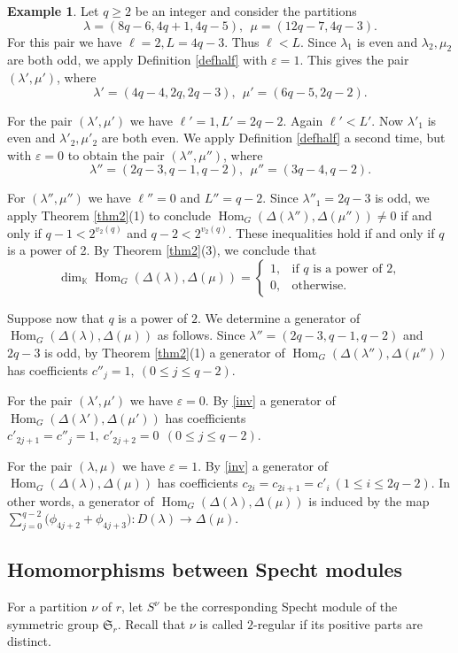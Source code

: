 \documentclass[11pt]{amsart}
\theoremstyle{remark}
\theoremstyle{definition}
\newtheorem{example}[theorem]{Example}
\newcommand{\Hom}{\operatorname{Hom}}
\newcommand{\D}{\Delta}
\newcommand{\la}{\lambda}
\newcommand{\K}{\mathbb K}
\numberwithin{equation}{section}
\begin{document}
\begin{example}
	Let $q\ge2$ be an integer and consider the partitions
	\[
	\la=(8q-6,4q+1,4q-5),
	\ \ 
	\mu=(12q-7,4q-3).
	\]
	For this pair we have
$
	\ell=2, 
	L=4q-3.
$
	Thus $\ell<L$. Since $\la_1$ is even and $\la_2,\mu_2$ are both odd,
	we apply Definition \ref{defhalf} with $\varepsilon=1$. This gives
	the pair $(\la',\mu')$, where
	\[
	\la'=(4q-4,2q,2q-3),
	\ \ 
	\mu'=(6q-5,2q-2).
	\]
	
	For the pair $(\la',\mu')$ we have
$
	\ell'=1, L'=2q-2.
$
	Again $\ell'<L'$. Now $\la'_1$ is even and $\la'_2,\mu'_2$ are both
	even. We apply Definition \ref{defhalf} a second time, but with
	$\varepsilon=0$ to obtain the pair $(\la'',\mu'')$, where
	\[
	\la''=(2q-3,q-1,q-2),
	\ \ 
	\mu''=(3q-4,q-2).
	\]
	
	For $(\la'',\mu'')$ we have $\ell''=0$ and $L''=q-2$.
	Since $\la''_1=2q-3$ is odd, we apply Theorem \ref{thm2}(1)
	to conclude $\Hom_G(\Delta(\la''),\Delta(\mu'')) \neq 0$ if and only if
	$	q-1<2^{v_2(q)}$ and
	$
	q-2<2^{v_2(q)}.
	$
	These inequalities hold if and only if $q$ is a power of 2. By
	Theorem \ref{thm2}(3), we conclude that
	\[
	\dim_\K\Hom_G(\Delta(\la),\Delta(\mu))
	=
	\begin{cases}
		1,&\text{if $q$ is a power of $2$},\\
		0,&\text{otherwise}.
	\end{cases}
	\]
	
	Suppose now that $q$ is a power of $2$. We determine a generator of $\Hom_G(\Delta(\la),\Delta(\mu))$ as follows. Since $\la''=(2q-3,q-1,q-2)$ and $2q-3$ is odd, by
	Theorem \ref{thm2}(1) a generator of $\Hom_G(\D(\la''),\D(\mu''))$
	has coefficients $c''_j=1,  \ (0\le j\le q-2)$.
	
	For the pair $(\la',\mu')$ we have $\varepsilon=0$. By \eqref{inv} a generator of  $\Hom_G(\D(\la'),\D(\mu'))$ has coefficients
$
	c'_{2j+1}=c''_j=1,
	\ 
	c'_{2j+2}=0
	\ \ (0\le j\le q-2).
$
	
	For the pair $(\la,\mu)$ we have $\varepsilon=1$. By \eqref{inv} a generator of  $\Hom_G(\D(\la),\D(\mu))$ has coefficients
	$
	c_{2i}=c_{2i+1}=c'_i
	\  (1\le i\le 2q-2).
	$
	In other words, a generator of
	$\Hom_G(\Delta(\la),\Delta(\mu))$ is induced by the map
$\sum_{j=0}^{q-2}\bigl(\phi_{4j+2}+\phi_{4j+3}\bigr): D(\la) \to \D(\mu)$.
\end{example}

	\subsection{Homomorphisms between Specht modules}\label{secspecht} For a partition $\nu$ of $r$, let $S^\nu$ be the corresponding Specht module of the symmetric group $\mathfrak{S}_r$. Recall that $\nu$ is called $2$-regular if its positive parts are distinct.
\end{document}
